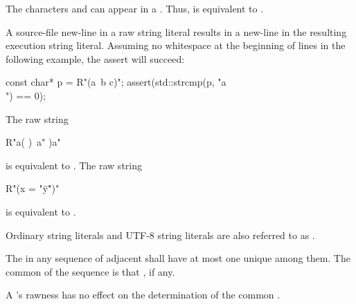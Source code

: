 \pnum
\begin{note}
The characters  and  can appear in a
. Thus,  is equivalent to
.
\end{note}

\pnum
\begin{note}
A source-file new-line in a raw string literal results in a new-line in the
resulting execution string literal. Assuming no
whitespace at the beginning of lines in the following example, the assert will succeed:
\begin{codeblock}
const char* p = R"(a\
b
c)";
assert(std::strcmp(p, "a\\\nb\nc") == 0);
\end{codeblock}
\end{note}

\pnum
\begin{example}
The raw string
\begin{codeblock}
R"a(
)\
a"
)a"
\end{codeblock}
is equivalent to . The raw string
\begin{codeblock}
R"(x = "\"y\"")"
\end{codeblock}
is equivalent to .
\end{example}

\pnum
{}%
Ordinary string literals and UTF-8 string literals are
also referred to as .

\pnum
{}%
The  in
any sequence of adjacent 
shall have at most one unique  among them.
The common \grammarterm{encoding-prefix} of the sequence is
that \grammarterm{encoding-prefix}, if any.
\begin{note}
A 's rawness has
no effect on the determination of the common .
\end{note}

